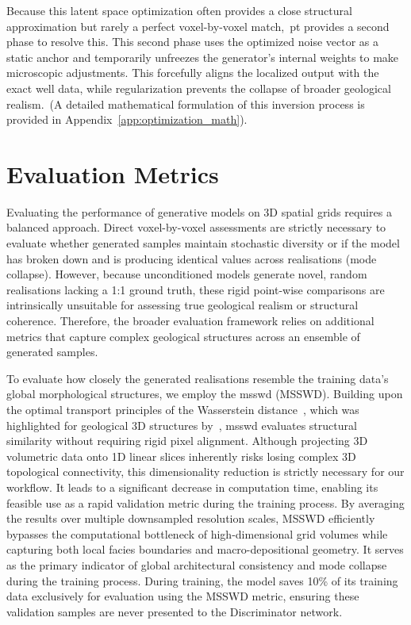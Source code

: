 Because this latent space optimization often provides a close structural approximation but rarely a perfect voxel-by-voxel match,~\gls{pt} provides a second phase to resolve this. This second phase uses the optimized noise vector as a static anchor and temporarily unfreezes the generator's internal weights to make microscopic adjustments. This forcefully aligns the localized output with the exact well data, while regularization prevents the collapse of broader geological realism.~(A detailed mathematical formulation of this inversion process is provided in Appendix~\ref{app:optimization_math}).

\section{Evaluation Metrics}\label{Sec:eval}
Evaluating the performance of generative models on 3D spatial grids requires a balanced approach. Direct voxel-by-voxel assessments are strictly necessary to evaluate whether generated samples maintain stochastic diversity or if the model has broken down and is producing identical values across realisations (mode collapse). However, because unconditioned models generate novel, random realisations lacking a 1:1 ground truth, these rigid point-wise comparisons are intrinsically unsuitable for assessing true geological realism or structural coherence. Therefore, the broader evaluation framework relies on additional metrics that capture complex geological structures across an ensemble of generated samples.

To evaluate how closely the generated realisations resemble the training data's global morphological structures, we employ the \gls{msswd} (MSSWD). Building upon the optimal transport principles of the Wasserstein distance~\parencite{panaretos2019statistical}, which was highlighted for geological 3D structures by~\textcite{rongier2025atowards}, \gls{msswd} evaluates structural similarity without requiring rigid pixel alignment. Although projecting 3D volumetric data onto 1D linear slices inherently risks losing complex 3D topological connectivity, this dimensionality reduction is strictly necessary for our workflow. It leads to a significant decrease in computation time, enabling its feasible use as a rapid validation metric during the training process. By averaging the results over multiple downsampled resolution scales, MSSWD efficiently bypasses the computational bottleneck of high-dimensional grid volumes while capturing both local facies boundaries and macro-depositional geometry. It serves as the primary indicator of global architectural consistency and mode collapse during the training process. During training, the model saves 10\% of its training data exclusively for evaluation using the MSSWD metric, ensuring these validation samples are never presented to the Discriminator network.


